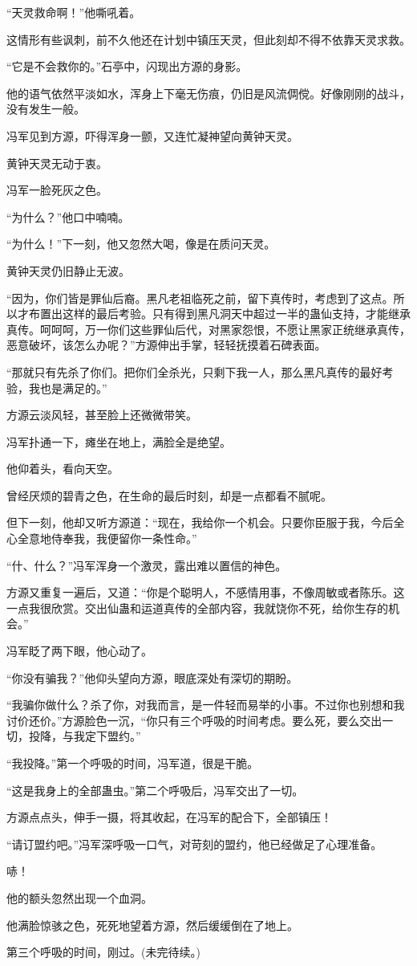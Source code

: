 \begin{this_body}
“天灵救命啊！”他嘶吼着。

这情形有些讽刺，前不久他还在计划中镇压天灵，但此刻却不得不依靠天灵求救。

“它是不会救你的。”石亭中，闪现出方源的身影。

他的语气依然平淡如水，浑身上下毫无伤痕，仍旧是风流倜傥。好像刚刚的战斗，没有发生一般。

冯军见到方源，吓得浑身一颤，又连忙凝神望向黄钟天灵。

黄钟天灵无动于衷。

冯军一脸死灰之色。

“为什么？”他口中喃喃。

“为什么！”下一刻，他又忽然大喝，像是在质问天灵。

黄钟天灵仍旧静止无波。

“因为，你们皆是罪仙后裔。黑凡老祖临死之前，留下真传时，考虑到了这点。所以才布置出这样的最后考验。只有得到黑凡洞天中超过一半的蛊仙支持，才能继承真传。呵呵呵，万一你们这些罪仙后代，对黑家怨恨，不愿让黑家正统继承真传，恶意破坏，该怎么办呢？”方源伸出手掌，轻轻抚摸着石碑表面。

“那就只有先杀了你们。把你们全杀光，只剩下我一人，那么黑凡真传的最好考验，我也是满足的。”

方源云淡风轻，甚至脸上还微微带笑。

冯军扑通一下，瘫坐在地上，满脸全是绝望。

他仰着头，看向天空。

曾经厌烦的碧青之色，在生命的最后时刻，却是一点都看不腻呢。

但下一刻，他却又听方源道：“现在，我给你一个机会。只要你臣服于我，今后全心全意地侍奉我，我便留你一条性命。”

“什、什么？”冯军浑身一个激灵，露出难以置信的神色。

方源又重复一遍后，又道：“你是个聪明人，不感情用事，不像周敏或者陈乐。这一点我很欣赏。交出仙蛊和运道真传的全部内容，我就饶你不死，给你生存的机会。”

冯军眨了两下眼，他心动了。

“你没有骗我？”他仰头望向方源，眼底深处有深切的期盼。

“我骗你做什么？杀了你，对我而言，是一件轻而易举的小事。不过你也别想和我讨价还价。”方源脸色一沉，“你只有三个呼吸的时间考虑。要么死，要么交出一切，投降，与我定下盟约。”

“我投降。”第一个呼吸的时间，冯军道，很是干脆。

“这是我身上的全部蛊虫。”第二个呼吸后，冯军交出了一切。

方源点点头，伸手一摄，将其收起，在冯军的配合下，全部镇压！

“请订盟约吧。”冯军深呼吸一口气，对苛刻的盟约，他已经做足了心理准备。

哧！

他的额头忽然出现一个血洞。

他满脸惊骇之色，死死地望着方源，然后缓缓倒在了地上。

第三个呼吸的时间，刚过。(未完待续。)

\end{this_body}

